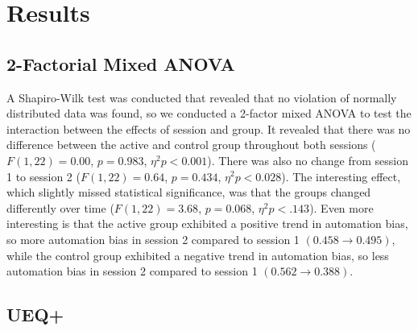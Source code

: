 \documentclass[sigconf,natbib=false]{acmart}
\begin{document}
\section{Results}

\subsection{2-Factorial Mixed ANOVA}
A Shapiro-Wilk test was conducted that revealed that no violation of normally distributed data was found, so we conducted a 2-factor mixed ANOVA to test the interaction between the effects of session and group.
It revealed that there was no difference between the active and control group throughout both sessions (\(F(1,22)=0.00\), \(p = 0.983\), \(\eta^2p < 0.001\)).
There was also no change from session 1 to session 2 (\(F(1,22)=0.64\), \(p = 0.434\), \(\eta^2p < 0.028\)).
The interesting effect, which slightly missed statistical significance, was that the groups changed differently over time (\(F(1,22)=3.68\), \(p = 0.068\), \(\eta^2p < .143\)).
Even more interesting is that the active group exhibited a positive trend in automation bias, so more automation bias in session 2 compared to session 1 \((0.458 \to 0.495)\), while the control group exhibited a negative trend in automation bias, so less automation bias in session 2 compared to session 1 \((0.562 \to 0.388)\).


\subsection{UEQ+}
\end{document}

